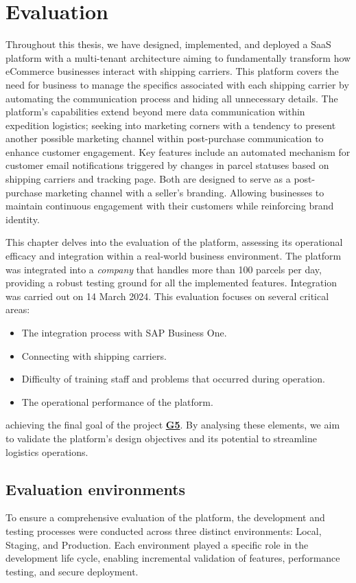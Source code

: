 
\chapter{Evaluation}
\label{chap:evaluation}
Throughout this thesis, we have designed, implemented, and deployed a \ac{SaaS} platform with a multi-tenant architecture aiming to fundamentally transform how eCommerce businesses interact with shipping carriers.
This platform covers the need for business to manage the specifics associated with each shipping carrier by automating the communication process and hiding all unnecessary details.
The platform's capabilities extend beyond mere data communication within expedition logistics; seeking into marketing corners with a tendency to present another possible marketing channel within post-purchase communication to enhance customer engagement.
Key features include an automated mechanism for customer email notifications triggered by changes in parcel statuses based on shipping carriers and tracking page.
Both are designed to serve as a post-purchase marketing channel with a seller's branding.
Allowing businesses to maintain continuous engagement with their customers while reinforcing brand identity.

This chapter delves into the evaluation of the platform, assessing its operational efficacy and integration within a real-world business environment.
The platform was integrated into a \textit{company} that handles more than 100 parcels per day, providing a robust testing ground for all the implemented features.
Integration was carried out on 14 March 2024.
This evaluation focuses on several critical areas:
\begin{itemize}
    \item The integration process with SAP Business One.
    \item Connecting with shipping carriers.
    \item Difficulty of training staff and problems that occurred during operation.
    \item The operational performance of the platform.
\end{itemize}
achieving the final goal of the project \hyperref[subsec:project-goals]{\textbf{G5}}.
By analysing these elements, we aim to validate the platform's design objectives and its potential to streamline logistics operations.


\section{Evaluation environments}
\label{sec:environments}
To ensure a comprehensive evaluation of the platform, the development and testing processes were conducted across three distinct environments: Local, Staging, and Production. 
Each environment played a specific role in the development life cycle, enabling incremental validation of features, performance testing, and secure deployment.


